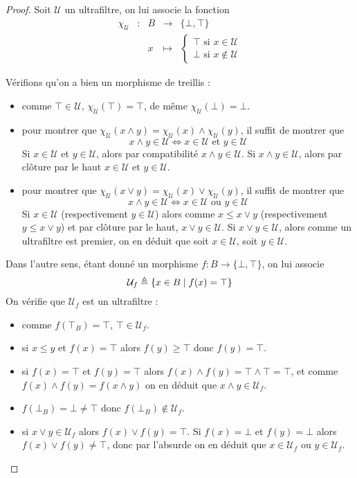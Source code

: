\begin{proof}
  Soit $\mathcal U$ un ultrafiltre, on lui associe la fonction
  \[\begin{array}{ccccc}
  \chi_{\mathcal U} & : & B & \longrightarrow & \{\bot,\top\}\\
  & & x &\longmapsto& \begin{cases}
    \top\text{ si } x\in \mathcal U\\
    \bot\text{ si } x\notin\mathcal U
  \end{cases}
  \end{array}\]

  Vérifions qu'on a bien un morphisme de treillis :
  \begin{itemize}
  \item comme $\top\in\mathcal U$, $\chi_\mathcal U(\top) = \top$, de même
    $\chi_\mathcal U(\bot) = \bot$.
  \item pour montrer que
    $\chi_\mathcal U(x\land y) = \chi_\mathcal U(x)\land\chi_\mathcal U(y)$, il
    suffit de montrer que
    \[x\land y \in \mathcal U \iff x\in\mathcal U \text{ et }y\in\mathcal U\]
    Si $x\in \mathcal U$ et $y\in\mathcal U$, alors par compatibilité
    $x\land y \in \mathcal U$. Si $x\land y \in \mathcal U$, alors par clôture
    par le haut $x\in \mathcal U$ et $y\in \mathcal U$.
  \item pour montrer que
    $\chi_\mathcal U(x\lor y) = \chi_\mathcal U(x)\lor\chi_\mathcal U(y)$, il
    suffit de montrer que
    \[x\land y \in \mathcal U \iff x\in\mathcal U \text{ ou }y\in\mathcal U\]
    Si $x\in \mathcal U$ (respectivement $y\in \mathcal U$) alors comme
    $x\leq x\lor y$ (respectivement $y\leq x\lor y$) et par clôture par le haut,
    $x\lor y \in \mathcal U$. Si $x\lor y \in \mathcal U$, alors comme un
    ultrafiltre est premier, on en déduit que soit $x\in\mathcal U$, soit
    $y\in \mathcal U$.
  \end{itemize}

  Dans l'autre sens, étant donné un morphisme $f : B \to \{\bot,\top\}$, on lui
  associe
  \[\mathcal U_f \triangleq \{x\in B \mid f(x) = \top\}\]
  On vérifie que $\mathcal U_f$ est un ultrafiltre :
  \begin{itemize}
  \item comme $f(\top_B) = \top$, $\top\in \mathcal U_f$.
  \item si $x\leq y$ et $f(x)=\top$ alors $f(y)\geq \top$ donc $f(y)=\top$.
  \item si $f(x) = \top$ et $f(y)=\top$ alors
    $f(x)\land f(y) = \top\land\top =\top$, et comme $f(x)\land f(y)=f(x\land y)$
    on en déduit que $x\land y \in \mathcal U_f$.
  \item $f(\bot_B)=\bot\neq\top$ donc $f(\bot_B)\notin\mathcal U_f$.
  \item si $x\lor y \in \mathcal U_f$ alors $f(x)\lor f(y) = \top$. Si
    $f(x) = \bot$ et $f(y) = \bot$ alors $f(x)\lor f(y) \neq \top$, donc par
    l'absurde on en déduit que $x\in \mathcal U_f$ ou $y\in \mathcal U_f$.
  \end{itemize}


\end{proof}

